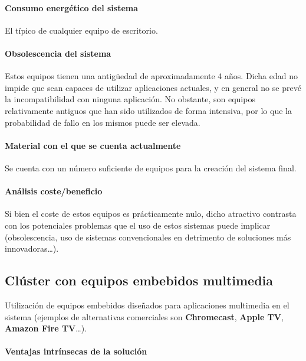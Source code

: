 \paragraph{Consumo energético del sistema\\}

El típico de cualquier equipo de escritorio.

\paragraph{Obsolescencia del sistema\\}

Estos equipos tienen una antigüedad de aproximadamente 4 años. Dicha edad no impide que sean capaces de utilizar aplicaciones actuales, y en general no se prevé la incompatibilidad con ninguna aplicación. No obstante, son equipos relativamente antiguos que han sido utilizados de forma intensiva, por lo que la probabilidad de fallo en los mismos puede ser elevada.

\paragraph{Material con el que se cuenta actualmente\\}

Se cuenta con un número suficiente de equipos para la creación del sistema final.

\paragraph{Análisis coste/beneficio\\}

Si bien el coste de estos equipos es prácticamente nulo, dicho atractivo contrasta con los potenciales problemas que el uso de estos sistemas puede implicar (obsolescencia, uso de sistemas convencionales en detrimento de soluciones más innovadoras\dots).

\subsection{Clúster con equipos embebidos multimedia}

Utilización de equipos embebidos diseñados para aplicaciones multimedia en el sistema (ejemplos de alternativas comerciales son \textbf{Chromecast}, \textbf{Apple TV}, \textbf{Amazon Fire TV}\dots).

\paragraph{Ventajas intrínsecas de la solución\\}

